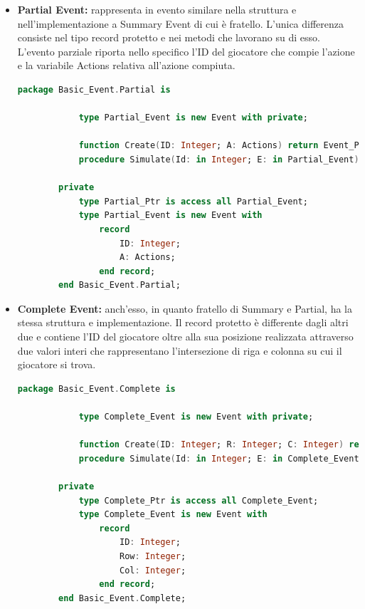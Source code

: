 \documentclass[aps,letterpaper,10pt]{article}
\begin{document}
\begin{itemize}
\begin{itemize}
	\end{itemize}
	
	\begin{itemize}
\item \textbf{Partial Event:} rappresenta in evento similare nella struttura e nell'implementazione a Summary Event di
cui \`e fratello. L'unica differenza consiste nel tipo record protetto e nei metodi che lavorano su di esso. L'evento
parziale riporta nello specifico l'ID del giocatore che compie l'azione e la variabile Actions relativa all'azione
compiuta.
		
		\begin{lstlisting}[language=Ada]
		package Basic_Event.Partial is
    
		    type Partial_Event is new Event with private;
	
			function Create(ID: Integer; A: Actions) return Event_Ptr; 
		    procedure Simulate(Id: in Integer; E: in Partial_Event);

		private
		    type Partial_Ptr is access all Partial_Event; 
		    type Partial_Event is new Event with
		        record
		            ID: Integer;
		            A: Actions;
		        end record;
		end Basic_Event.Partial;
		\end{lstlisting}
	\end{itemize}
	
	\begin{itemize}
\item \textbf{Complete Event:} anch'esso, in quanto fratello di Summary e Partial, ha la stessa struttura e
implementazione. Il record protetto \`e differente dagli altri due e contiene l'ID del giocatore oltre alla sua
posizione realizzata attraverso due valori interi che rappresentano l'intersezione di riga e colonna su cui il giocatore
si trova.
		
		\begin{lstlisting}[language=Ada]
		package Basic_Event.Complete is
    
		    type Complete_Event is new Event with private;
	
		    function Create(ID: Integer; R: Integer; C: Integer) return Event_Ptr; 
		    procedure Simulate(Id: in Integer; E: in Complete_Event);

		private
		    type Complete_Ptr is access all Complete_Event; 
		    type Complete_Event is new Event with
		        record
		            ID: Integer;
		            Row: Integer;
		            Col: Integer;
		        end record;
		end Basic_Event.Complete;
		\end{lstlisting}	
	\end{itemize}
	
\end{itemize}
\end{document}
